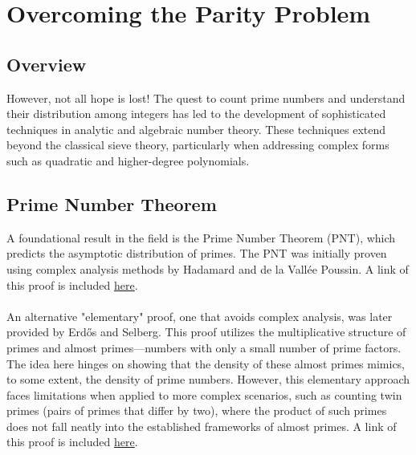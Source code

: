 \documentclass[10pt]{extarticle}
\begin{document}
\pagebreak
\section{Overcoming the Parity Problem}
\subsection{Overview}
However, not all hope is lost! The quest to count prime numbers and understand their distribution among integers has led to the development of sophisticated techniques in analytic and algebraic number theory. 
These techniques extend beyond the classical sieve theory, particularly when addressing complex forms such as quadratic and higher-degree polynomials.

\subsection{Prime Number Theorem}
A foundational result in the field is the Prime Number Theorem (PNT), which predicts the asymptotic distribution of primes. The PNT was initially proven using complex analysis methods by Hadamard and de la Vallée Poussin. A link of this proof is included \href{https://people.mpim-bonn.mpg.de/zagier/files/doi/10.2307/2975232/fulltext.pdf}{here}. \\
\\
An alternative "elementary" proof, one that avoids complex analysis, was later provided by Erdős and Selberg. This proof utilizes the multiplicative structure of primes and almost primes—numbers with only a small number of prime factors. The idea here hinges on showing that the density of these almost primes mimics, to some extent, the density of prime numbers. However, this elementary approach faces limitations when applied to more complex scenarios, such as counting twin primes (pairs of primes that differ by two), where the product of such primes does not fall neatly into the established frameworks of almost primes. A link of this proof is included \href{https://www.math.columbia.edu/~goldfeld/ErdosSelbergDispute.pdf}{here}.
\end{document}
